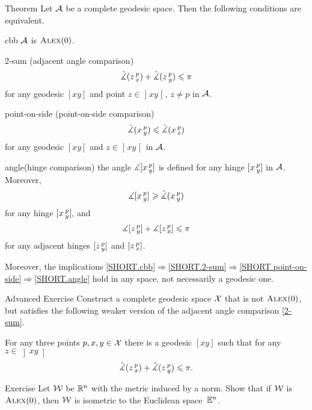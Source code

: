 \begin{thm}{Theorem}\label{thm:defs_of_alex} 
Let $\mathcal{A}$ be a complete geodesic space.
Then the following conditions are equivalent.

\begin{subthm}{cbb}
$\mathcal{A}$ is $\textsc{Alex}(0)$.
\end{subthm}
 

\begin{subthm}{2-sum} 
(adjacent angle comparison)
\[\tilde\measuredangle(z\,{}^{p}_{x})
+\tilde\measuredangle(z\,{}^{p}_{y})\leqslant \pi\]
for any geodesic $[x y]$ and point $z\in \mathopen{]}x y\mathclose{[}$, $z\ne p$ in $\mathcal{A}$.
\end{subthm}

\begin{subthm}{point-on-side}
(point-on-side comparison)
\[\tilde\measuredangle(x\,{}^{p}_{y})\leqslant\tilde\measuredangle(x\,{}^{p}_{z})\]
for any geodesic $[x y]$ and $z\in \mathopen{]}x y\mathclose{[}$ in $\mathcal{A}$.
\end{subthm}

\begin{subthm}{angle}(hinge comparison)
the angle $\measuredangle[x\,{}^{p}_{y}]$ is defined for any hinge $[x\,{}^{p}_{y}]$ in $\mathcal{A}$.
Moreover, 
\[\measuredangle[x\,{}^{p}_{y}]\geqslant\tilde\measuredangle(x\,{}^{p}_{y})\]
for any hinge $[x\,{}^{p}_{y}]$, and
\[\measuredangle[z\,{}^{p}_{y}] + \measuredangle[z\,{}^{p}_{x}]\leqslant\pi\]
for any adjacent hinges $[z\,{}^{p}_{y}]$ and $[z\,{}^{p}_{x}]$.
\end{subthm}

Moreover, the implications \ref{SHORT.cbb}$\Rightarrow$\ref{SHORT.2-sum}$\Rightarrow$\ref{SHORT.point-on-side}$\Rightarrow$\ref{SHORT.angle} hold in any space, not necessarily a geodesic one.
\end{thm}

\begin{thm}{Advanced Exercise}\label{ex:urysohn}
Construct a complete geodesic space $\mathcal{X}$ that is not $\textsc{Alex}(0)$, but satisfies the following weaker version of the adjacent angle comparison \ref{2-sum}.

For any three points $p,x,y\in \mathcal{X}$ there is a geodesic $[x y]$ such that for any $z\in \left]x y\right[$
\[\tilde\measuredangle(z\,{}^{p}_{x})+\tilde\measuredangle(z\,{}^{p}_{y})
\leqslant
\pi.\]
\end{thm}

\begin{thm}{Exercise}\label{ex:normCBB}
Let $\mathcal{W}$ be $\mathbb{R}^n$ with the metric induced by a norm.
Show that if $\mathcal{W}$ is $\textsc{Alex}(0)$, then $\mathcal{W}$ is isometric to the Euclidean space~$\mathbb{E}^n$.
\end{thm}

